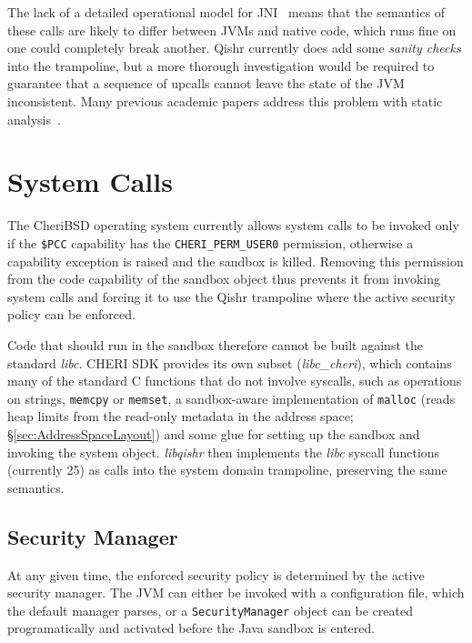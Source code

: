 \documentclass[a4paper,12pt,twoside,openright]{report}
\newcommand{\reg}[1]{\texttt{\$#1}}
\newcommand{\class}[1]{\texttt{#1}}
\newcommand{\tool}[1]{\emph{#1}}
\newcommand{\lib}[1]{\tool{lib#1}}
\begin{document}
The lack of a detailed operational model for JNI~\cite{Tan:2010:JNIFormalModel} means that the semantics of these calls are likely to differ between JVMs and native code, which runs fine on one could completely break another. Qishr currently does add some \emph{sanity checks} into the trampoline, but a more thorough investigation would be required to guarantee that a sequence of upcalls cannot leave the state of the JVM inconsistent. Many previous academic papers address this problem with static analysis~\cite{Kondoh:2008:FBJ:1390630.1390645, Li:2009:FBE:1653662.1653716, Li:2011:JEC:2048066.2048095}.

\section{System Calls}

The CheriBSD operating system currently allows system calls to be invoked only if the \reg{PCC} capability has the \texttt{CHERI\_PERM\_USER0} permission, otherwise a capability exception is raised and the sandbox is killed. Removing this permission from the code capability of the sandbox object thus prevents it from invoking system calls and forcing it to use the Qishr trampoline where the active security policy can be enforced.

Code that should run in the sandbox therefore cannot be built against the standard \lib{c}. CHERI SDK provides its own subset (\lib{c\_cheri}), which contains many of the standard C functions that do not involve syscalls, such as operations on strings, \texttt{memcpy} or \texttt{memset}, a sandbox-aware implementation of \texttt{malloc} (reads heap limits from the read-only metadata in the address space; \S\ref{sec:AddressSpaceLayout}) and some glue for setting up the sandbox and invoking the system object. \lib{qishr} then implements the \lib{c} syscall functions (currently 25) as calls into the system domain trampoline, preserving the same semantics.

\subsection{Security Manager}

At any given time, the enforced security policy is determined by the active security manager. The JVM can either be invoked with a configuration file, which the default manager parses, or a \class{Security\-Manager} object can be created programatically and activated before the Java sandbox is entered.
\end{document}
